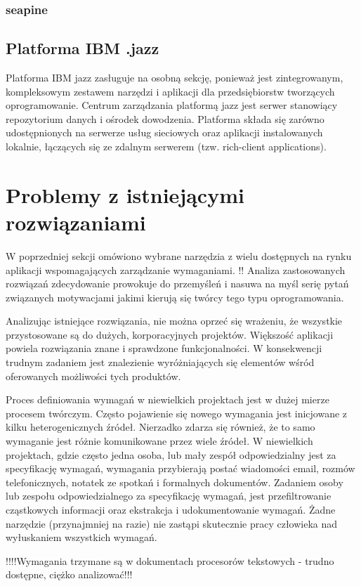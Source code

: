       \subsubsection{seapine}

    \subsection{Platforma IBM .jazz}

      Platforma IBM jazz zasługuje na osobną sekcję, ponieważ jest zintegrowanym, kompleksowym zestawem narzędzi i aplikacji dla przedsiębiorstw tworzących oprogramowanie. Centrum zarządzania platformą jazz jest serwer stanowiący repozytorium danych i ośrodek dowodzenia. Platforma składa się zarówno udostępnionych na serwerze usług sieciowych oraz aplikacji instalowanych lokalnie, łączących się ze zdalnym serwerem (tzw. rich-client applications). 

  \section{Problemy z istniejącymi rozwiązaniami}

      W poprzedniej sekcji omówiono wybrane narzędzia z wielu dostępnych na rynku aplikacji wspomagających zarządzanie wymaganiami. !! Analiza zastosowanych rozwiązań zdecydowanie prowokuje do przemyśleń i nasuwa na myśl serię pytań związanych motywacjami jakimi kierują się twórcy tego typu oprogramowania. 

      Analizując istniejące rozwiązania, nie można oprzeć się wrażeniu, że wszystkie przystosowane są do dużych, korporacyjnych projektów. Większość aplikacji powiela rozwiązania znane i sprawdzone funkcjonalności. W konsekwencji trudnym zadaniem jest znalezienie wyróżniających się elementów wśród oferowanych możliwości tych produktów. 

      Proces definiowania wymagań w niewielkich projektach jest w dużej mierze procesem twórczym. Często pojawienie się nowego wymagania jest inicjowane z kilku heterogenicznych źródeł. Nierzadko zdarza się również, że to samo wymaganie jest różnie komunikowane przez wiele źródeł. W niewielkich projektach, gdzie często jedna osoba, lub mały zespół odpowiedzialny jest za specyfikację wymagań, wymagania przybierają postać wiadomości email, rozmów telefonicznych, notatek ze spotkań i formalnych dokumentów. Zadaniem osoby lub zespołu odpowiedzialnego za specyfikację wymagań, jest przefiltrowanie cząstkowych informacji oraz ekstrakcja i udokumentowanie wymagań. Żadne narzędzie (przynajmniej na razie) nie zastąpi skutecznie pracy człowieka nad wyłuskaniem wszystkich wymagań. 

      !!!!Wymagania trzymane są w dokumentach procesorów tekstowych - trudno dostępne, ciężko analizować!!!
